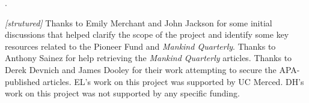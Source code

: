 \documentclass[12pt]{article}
\newcounter{lastnote}
\newenvironment{scilastnote}{%
\setcounter{lastnote}{\value{enumiv}}%
\addtocounter{lastnote}{+1}%
\begin{list}%
{\arabic{lastnote}.}
{\setlength{\leftmargin}{.22in}}
{\setlength{\labelsep}{.5em}}}
{\end{list}}
\begin{document}
\begin{scilastnote}
\item \emph{{[}strutured{]}} Thanks to Emily Merchant and John Jackson for some initial discussions that helped clarify the scope of the project and identify some key resources related to the Pioneer Fund and \emph{Mankind Quarterly}. Thanks to Anthony Sainez for help retrieving the \emph{Mankind Quarterly} articles. Thanks to Derek Devnich and James Dooley for their work attempting to secure the APA-published articles. EL's work on this project was supported by UC Merced. DH's work on this project was not supported by any specific funding.
\end{scilastnote}


\renewcommand{\thetable}{\arabic{table}}
\renewcommand{\thefigure}{\arabic{figure}}
\setcounter{table}{0}
\setcounter{figure}{0}









\end{document}
